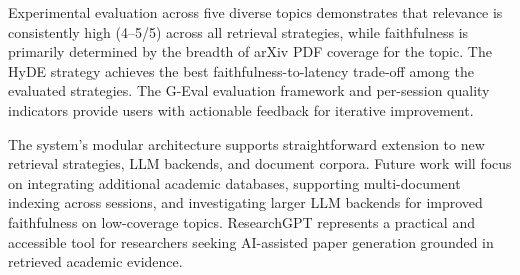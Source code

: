 \documentclass[12pt, a4paper]{article}
\begin{document}
Experimental evaluation across five diverse topics demonstrates that relevance
is consistently high (4--5/5) across all retrieval strategies, while faithfulness
is primarily determined by the breadth of arXiv PDF coverage for the topic.
The HyDE strategy achieves the best faithfulness-to-latency trade-off among the
evaluated strategies. The G-Eval evaluation framework and per-session quality
indicators provide users with actionable feedback for iterative improvement.

The system's modular architecture supports straightforward extension to new
retrieval strategies, LLM backends, and document corpora. Future work will focus
on integrating additional academic databases, supporting multi-document indexing
across sessions, and investigating larger LLM backends for improved faithfulness
on low-coverage topics. ResearchGPT represents a practical and accessible tool
for researchers seeking AI-assisted paper generation grounded in retrieved academic
evidence.
\end{document}
